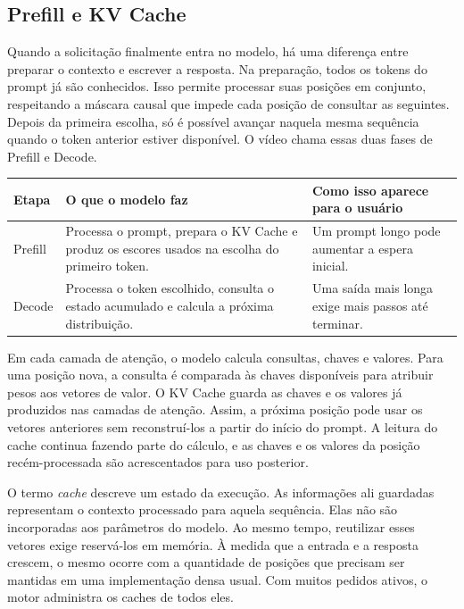\documentclass[12pt,a4paper]{article}
\begin{document}
\subsection{Prefill e KV Cache}

Quando a solicitação finalmente entra no modelo, há uma diferença entre preparar o contexto e escrever a resposta. Na preparação, todos os tokens do prompt já são conhecidos. Isso permite processar suas posições em conjunto, respeitando a máscara causal que impede cada posição de consultar as seguintes. Depois da primeira escolha, só é possível avançar naquela mesma sequência quando o token anterior estiver disponível. O vídeo chama essas duas fases de Prefill e Decode.

\begin{table}[htbp]
    \centering
    \begin{tabular}{>{\raggedright\arraybackslash}p{2.2cm} >{\raggedright\arraybackslash}p{7.2cm} >{\raggedright\arraybackslash}p{5.1cm}}
        \toprule
        \textbf{Etapa} & \textbf{O que o modelo faz} & \textbf{Como isso aparece para o usuário} \\
        \midrule
        Prefill & Processa o prompt, prepara o KV Cache e produz os escores usados na escolha do primeiro token. & Um prompt longo pode aumentar a espera inicial. \\
        \addlinespace
        Decode & Processa o token escolhido, consulta o estado acumulado e calcula a próxima distribuição. & Uma saída mais longa exige mais passos até terminar. \\
        \bottomrule
    \end{tabular}
\end{table}

Em cada camada de atenção, o modelo calcula consultas, chaves e valores. Para uma posição nova, a consulta é comparada às chaves disponíveis para atribuir pesos aos vetores de valor. O KV Cache guarda as chaves e os valores já produzidos nas camadas de atenção. Assim, a próxima posição pode usar os vetores anteriores sem reconstruí-los a partir do início do prompt. A leitura do cache continua fazendo parte do cálculo, e as chaves e os valores da posição recém-processada são acrescentados para uso posterior.

O termo \textit{cache} descreve um estado da execução. As informações ali guardadas representam o contexto processado para aquela sequência. Elas não são incorporadas aos parâmetros do modelo. Ao mesmo tempo, reutilizar esses vetores exige reservá-los em memória. À medida que a entrada e a resposta crescem, o mesmo ocorre com a quantidade de posições que precisam ser mantidas em uma implementação densa usual. Com muitos pedidos ativos, o motor administra os caches de todos eles.
\end{document}
